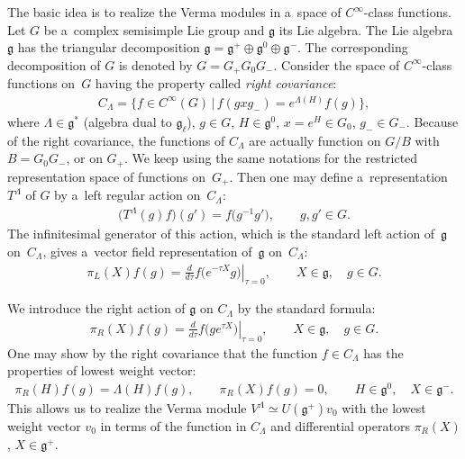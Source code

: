 \documentclass[pdftex]{sigma}
\numberwithin{equation}{section}
\begin{document}
The basic idea is to realize the Verma modules in a~space of $C^{\infty}$-class functions.
Let $G$ be a~complex semisimple Lie group and $ \mathfrak g $ its Lie algebra.
The Lie algebra $ \mathfrak g $ has the triangular decomposition $ {\mathfrak g} = {\mathfrak g}^+ \oplus {\mathfrak
g}^0 \oplus {\mathfrak g}^-$.
The corresponding decomposition of $ G $ is denoted by $ G = G_+ G_0 G_-$.
Consider the space of $C^{\infty}$-class functions on~$G$ having the property called \textit{right covariance}:
\begin{gather*}
C_{\Lambda} = \big\{ f \in C^{\infty}(G) \, | \, f(gxg_-) = e^{\Lambda(H)} f(g) \big\},
\end{gather*}
where $ \Lambda \in {\mathfrak g}^* $ (algebra dual to ${\mathfrak g}_{\ell}$), $ g \in G$, $H \in {\mathfrak g}^0$, $x
= e^H \in G_0$, $g_-\in G_-$.
Because of the right covariance, the functions of $ C_{\Lambda} $ are actually function on $ G/B $ with $ B = G_0 G_-$,
or on $ G_+$.
We keep using the same notations for the restricted representation space of functions on~$ G_+$.
Then one may def\/ine a~representation $T^{\Lambda}$ of $ G $ by a~left regular action on~$ C_{\Lambda}$:
\begin{gather*}
\big(T^{\Lambda}(g) f\big)(g') = f\big(g^{-1}g'\big),
\qquad
g, g' \in G.
\end{gather*}
The inf\/initesimal generator of this action, which is the standard left action of~$ \mathfrak g $ on~$ C_{\Lambda}$,
gives a~vector f\/ield representation of~$ \mathfrak g$ on~$ C_{\Lambda}$:
\begin{gather*}
\pi_L(X) f(g) = \left.
\frac{d}{d\tau} f\big(e^{-\tau X} g\big) \right|_{\tau=0},
\qquad
X \in {\mathfrak g}, \quad g \in G.
\end{gather*}



We introduce the right action of $ \mathfrak g $ on $ C_{\Lambda} $ by the standard formula:
\begin{gather*}
\pi_R(X) f(g) = \left.
\frac{d}{d\tau} f\big(g e^{\tau X}\big) \right|_{\tau = 0},
\qquad
X \in {\mathfrak g}, \quad g \in G.
\end{gather*}
One may show by the right covariance that the function $ f \in C_{\Lambda} $ has the properties of lowest weight vector:
\begin{gather*}
\pi_R(H) f(g) = \Lambda(H) f(g),
\qquad
\pi_R(X) f(g) = 0,
\qquad
H \in {\mathfrak g}^0, \quad X \in {\mathfrak g}^-.
\end{gather*}
This allows us to realize the Verma module $ V^{\Lambda} \simeq U({\mathfrak g}^+) v_0 $ with the lowest weight vector $
v_0 $ in terms of the function in $ C_{\Lambda} $ and dif\/ferential operators $ \pi_R(X)$, $X \in {\mathfrak g}^+$.
\end{document}
